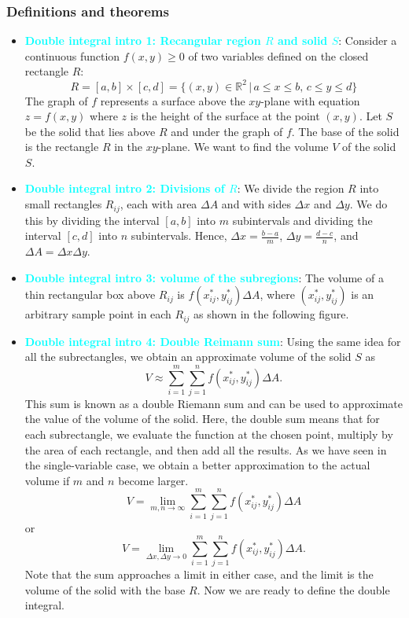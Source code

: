 \documentclass{report}
\begin{document}
    \subsubsection{Definitions and theorems}
    \begin{itemize}
        \item \textbf{\textcolor{cyan}{Double integral intro 1: Recangular region $R$ and solid $S$}}:
            Consider a continuous function $f(x,y) \geq 0$ of two variables defined on the closed rectangle $R$:
            \[
                R = [a,b] \times [c,d] = \{(x,y) \in \mathbb{R}^2 \,|\, a \leq x \leq b, \, c \leq y \leq d\}
            \]
            \bigbreak \noindent 
            The graph of $f$ represents a surface above the $xy$-plane with equation $z = f(x,y)$ where $z$ is the height of the surface at the point $(x,y)$. Let $S$ be the solid that lies above $R$ and under the graph of $f$. The base of the solid is the rectangle $R$ in the $xy$-plane. We want to find the volume $V$ of the solid $S$.
            \bigbreak \noindent 
        \item \textbf{\textcolor{cyan}{Double integral intro 2: Divisions of $R$}}:
            We divide the region $R$ into small rectangles $R_{ij}$, each with area $\Delta A$ and with sides $\Delta x$ and $\Delta y$. We do this by dividing the interval $[a,b]$ into $m$ subintervals and dividing the interval $[c,d]$ into $n$ subintervals. Hence, $\Delta x = \frac{b-a}{m}$, $\Delta y = \frac{d-c}{n}$, and $\Delta A = \Delta x \Delta y$.
            \bigbreak \noindent 
        \item \textbf{\textcolor{cyan}{Double integral intro 3: volume of the subregions}}:
            The volume of a thin rectangular box above $R_{ij}$ is $f(x^*_{ij}, y^*_{ij})\Delta A$, where $(x^*_{ij}, y^*_{ij})$ is an arbitrary sample point in each $R_{ij}$ as shown in the following figure.
            \bigbreak \noindent 
        \item \textbf{\textcolor{cyan}{Double integral intro 4: Double Reimann sum}}:
            Using the same idea for all the subrectangles, we obtain an approximate volume of the solid $S$ as 
            \[ V \approx \sum_{i=1}^{m}\sum_{j=1}^{n} f(x^*_{ij}, y^*_{ij})\Delta A. \]
            This sum is known as a double Riemann sum and can be used to approximate the value of the volume of the solid. Here, the double sum means that for each subrectangle, we evaluate the function at the chosen point, multiply by the area of each rectangle, and then add all the results.
            \bigbreak \noindent 
            As we have seen in the single-variable case, we obtain a better approximation to the actual volume if $m$ and $n$ become larger.
            \[ V = \lim_{m,n \to \infty} \sum_{i=1}^{m}\sum_{j=1}^{n} f(x^*_{ij}, y^*_{ij})\Delta A \]
            or
            \[ V = \lim_{\Delta x, \Delta y \to 0} \sum_{i=1}^{m}\sum_{j=1}^{n} f(x^*_{ij}, y^*_{ij})\Delta A. \]
            Note that the sum approaches a limit in either case, and the limit is the volume of the solid with the base $R$. Now we are ready to define the double integral.


\end{itemize}
\end{document}
